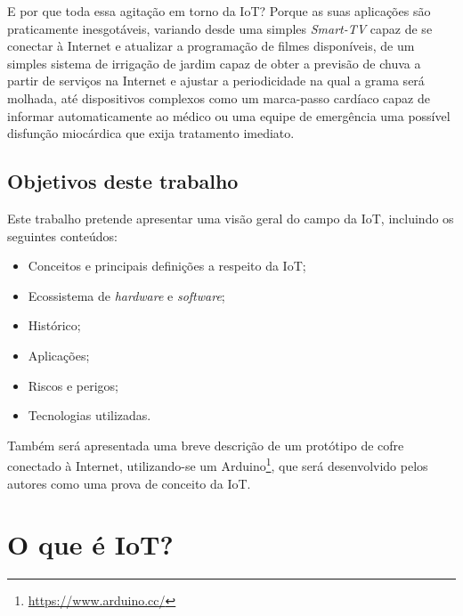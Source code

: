 \documentclass[pdftex, brazil, 12pt, twoside]{article}
\newcommand{\ingles}[1]{\textit{#1}}
\begin{document}
E por que toda essa agitação em torno da IoT? Porque as suas aplicações
são praticamente inesgotáveis, variando desde uma simples
\ingles{Smart-TV} capaz de se conectar à Internet e atualizar a programação de
filmes disponíveis, de um simples sistema de irrigação de jardim capaz de
obter a previsão de chuva a partir de serviços na Internet e ajustar a periodicidade
na qual a grama será molhada, até dispositivos complexos como um marca-passo cardíaco
capaz de informar automaticamente ao médico ou uma equipe de emergência uma possível
disfunção miocárdica que exija tratamento imediato.


\subsection{Objetivos deste trabalho}
\label{intro-objetivos}

Este trabalho pretende apresentar uma visão geral do campo da IoT, incluindo os
seguintes conteúdos:

\begin{itemize}[noitemsep]
\item Conceitos e principais definições a respeito da IoT;
\item Ecossistema de \ingles{hardware} e \ingles{software};
\item Histórico;
\item Aplicações;
\item Riscos e perigos;
\item Tecnologias utilizadas.
\end{itemize}

Também será apresentada uma breve descrição de um protótipo de
cofre conectado à Internet, utilizando-se um Arduino\footnote{\url{https://www.arduino.cc/}},
que será desenvolvido pelos autores como uma prova de conceito da IoT.


\section{O que é IoT?}
\label{o-que-e-iot}


\end{document}
